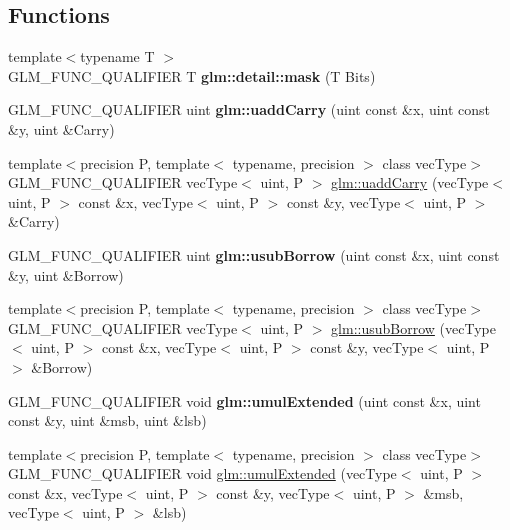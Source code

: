 \subsection*{Functions}
\begin{DoxyCompactItemize}
\item 
\mbox{\label{func__integer_8inl_a048ad00e8777f9f3ebe185ed48857df0}} 
{\footnotesize template$<$typename T $>$ }\\G\+L\+M\+\_\+\+F\+U\+N\+C\+\_\+\+Q\+U\+A\+L\+I\+F\+I\+ER T {\bfseries glm\+::detail\+::mask} (T Bits)
\item 
\mbox{\label{func__integer_8inl_a541d30d3289d3a3da69edec69df11a04}} 
G\+L\+M\+\_\+\+F\+U\+N\+C\+\_\+\+Q\+U\+A\+L\+I\+F\+I\+ER uint {\bfseries glm\+::uadd\+Carry} (uint const \&x, uint const \&y, uint \&Carry)
\item 
{\footnotesize template$<$precision P, template$<$ typename, precision $>$ class vec\+Type$>$ }\\G\+L\+M\+\_\+\+F\+U\+N\+C\+\_\+\+Q\+U\+A\+L\+I\+F\+I\+ER vec\+Type$<$ uint, P $>$ \hyperlink{group__core__func__integer_ga2fc1a46e7b7e9fbbd8fa444fbacaa2aa}{glm\+::uadd\+Carry} (vec\+Type$<$ uint, P $>$ const \&x, vec\+Type$<$ uint, P $>$ const \&y, vec\+Type$<$ uint, P $>$ \&Carry)
\item 
\mbox{\label{func__integer_8inl_ac7a75ea277a43b855920597adeebb2e3}} 
G\+L\+M\+\_\+\+F\+U\+N\+C\+\_\+\+Q\+U\+A\+L\+I\+F\+I\+ER uint {\bfseries glm\+::usub\+Borrow} (uint const \&x, uint const \&y, uint \&Borrow)
\item 
{\footnotesize template$<$precision P, template$<$ typename, precision $>$ class vec\+Type$>$ }\\G\+L\+M\+\_\+\+F\+U\+N\+C\+\_\+\+Q\+U\+A\+L\+I\+F\+I\+ER vec\+Type$<$ uint, P $>$ \hyperlink{group__core__func__integer_ga22a889bf08313b7e547e2cdb8bb15ee4}{glm\+::usub\+Borrow} (vec\+Type$<$ uint, P $>$ const \&x, vec\+Type$<$ uint, P $>$ const \&y, vec\+Type$<$ uint, P $>$ \&Borrow)
\item 
\mbox{\label{func__integer_8inl_a8d2521311c96c4b426be9857010b6b76}} 
G\+L\+M\+\_\+\+F\+U\+N\+C\+\_\+\+Q\+U\+A\+L\+I\+F\+I\+ER void {\bfseries glm\+::umul\+Extended} (uint const \&x, uint const \&y, uint \&msb, uint \&lsb)
\item 
{\footnotesize template$<$precision P, template$<$ typename, precision $>$ class vec\+Type$>$ }\\G\+L\+M\+\_\+\+F\+U\+N\+C\+\_\+\+Q\+U\+A\+L\+I\+F\+I\+ER void \hyperlink{group__core__func__integer_ga456ff9dcec42f6769a9ae2a2af7f1ce1}{glm\+::umul\+Extended} (vec\+Type$<$ uint, P $>$ const \&x, vec\+Type$<$ uint, P $>$ const \&y, vec\+Type$<$ uint, P $>$ \&msb, vec\+Type$<$ uint, P $>$ \&lsb)

\end{DoxyCompactItemize}

